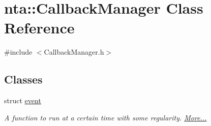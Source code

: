 \hypertarget{classnta_1_1CallbackManager}{}\section{nta\+:\+:Callback\+Manager Class Reference}
\label{classnta_1_1CallbackManager}


{\ttfamily \#include $<$Callback\+Manager.\+h$>$}

\subsection*{Classes}
\begin{DoxyCompactItemize}
\item 
struct \hyperlink{classnta_1_1CallbackManager_d3/dc5/structnta_1_1CallbackManager_1_1event}{event}
\begin{DoxyCompactList}\small\item\em A function to run at a certain time with some regularity.  \hyperlink{classnta_1_1CallbackManager_d3/dc5/structnta_1_1CallbackManager_1_1event}{More...}\end{DoxyCompactList}\end{DoxyCompactItemize}
